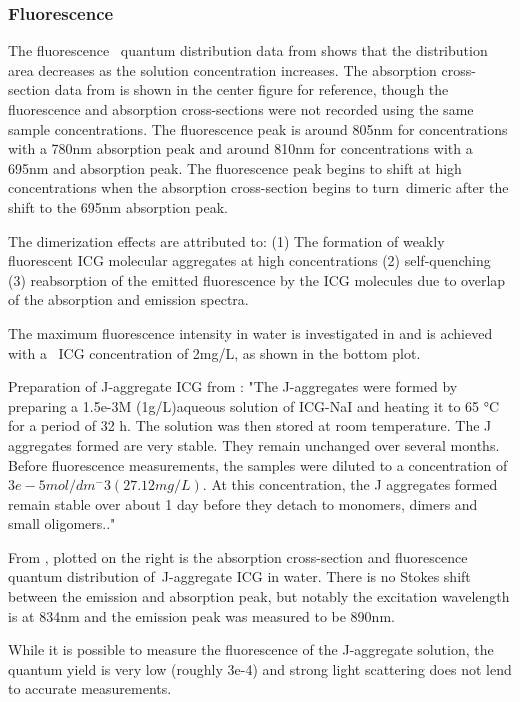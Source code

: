 \subsubsection{ Fluorescence}
The fluorescence  quantum distribution data from \cite{philip} shows that the distribution area decreases as the solution concentration increases. The absorption cross-section data from \cite{philip} is shown in the center figure for reference, though the fluorescence and absorption cross-sections were not recorded using the same sample concentrations. The fluorescence peak is around 805nm for concentrations with a 780nm absorption peak and around 810nm for concentrations with a 695nm and absorption peak. The fluorescence peak begins to shift at high concentrations when the absorption cross-section begins to turn dimeric after the shift to the 695nm absorption peak.  

The dimerization effects are attributed to:
(1) The formation of weakly fluorescent ICG molecular aggregates at high concentrations
(2) self-quenching
(3) reabsorption of the emitted fluorescence by the ICG molecules due to overlap of the absorption and emission spectra.

The maximum fluorescence intensity in water is investigated in \cite{saxena} and is achieved with a  ICG concentration of 2mg/L, as shown in the bottom plot. 

Preparation of J-aggregate ICG from \cite{rotermund}:
"The J-aggregates were formed by preparing a 1.5e-3M (1g/L)aqueous solution of ICG-NaI and heating it to 65 °C for a period of 32 h. The solution was then stored at room temperature. The J aggregates formed are very stable. They remain unchanged over several months. Before fluorescence measurements, the samples were diluted to a concentration of $3e-5mol/dm^-3 (27.12mg/L)$. At this concentration, the J aggregates formed remain stable over about 1 day before they detach to monomers, dimers and small oligomers.."

From \cite{rotermund}, plotted on the right is the absorption cross-section and fluorescence quantum distribution of J-aggregate ICG in water. There is no Stokes shift between the emission and absorption peak, but notably the excitation wavelength is at 834nm and the emission peak was measured to be 890nm. 

While it is possible to measure the fluorescence of the J-aggregate solution, the quantum yield is very low (roughly 3e-4) and strong light scattering does not lend to accurate measurements.

